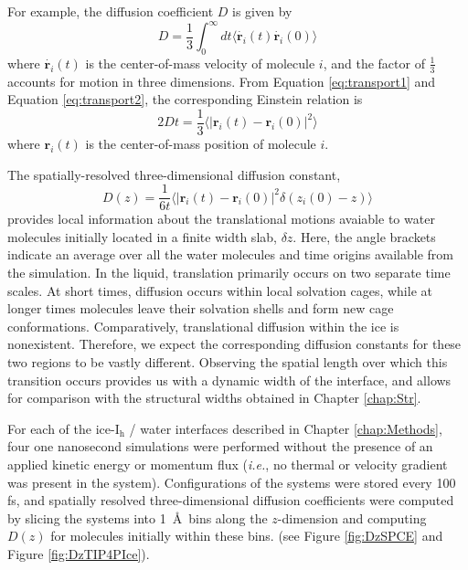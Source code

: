 For example, the diffusion coefficient $D$ is given by
\begin{equation}\label{eq:diffusion1}
D = \frac{1}{3} \int_0^{\infty} dt \langle \dot{\mathbf{r}_i}(t) 
\dot{\mathbf{r}_i}(0) \rangle
\end{equation}
where $\dot{\mathbf{r}_i}(t)$ is the center-of-mass velocity of molecule
$i$, and the factor of $\frac{1}{3}$ accounts for motion in three
dimensions. From Equation \eqref{eq:transport1} and Equation \eqref{eq:transport2},
the corresponding Einstein relation is
\begin{equation}\label{eq:diffusion2}
2Dt = \frac{1}{3} \langle | \mathbf{r}_i(t) - \mathbf{r}_i(0) |^2 \rangle
\end{equation}
where $\mathbf{r}_i(t)$ is the center-of-mass position of molecule
$i$. 

The spatially-resolved three-dimensional diffusion constant,
\begin{equation}\label{eq:diffusion3}
D(z) = \frac{1}{6t} \langle | \mathbf{r}_i(t) - \mathbf{r}_i(0) |^2
\delta(z_i(0) - z)  \rangle 
\end{equation}
provides local information about the translational motions avaiable to
water molecules initially located in a finite width slab, $\delta
z$. Here, the angle brackets indicate an average over all the water
molecules and time origins available from the simulation. In the
liquid, translation primarily occurs on two separate time scales. At
short times, diffusion occurs within local solvation cages, while at
longer times molecules leave their solvation shells and form new cage
conformations. Comparatively, translational diffusion within the ice
is nonexistent. Therefore, we expect the corresponding diffusion
constants for these two regions to be vastly different. Observing the
spatial length over which this transition occurs provides us with a
dynamic width of the interface, and allows for comparison with the
structural widths obtained in Chapter \ref{chap:Str}.

For each of the ice-I$_\mathrm{h}$ / water interfaces described in
Chapter \ref{chap:Methods}, four one nanosecond simulations were
performed without the presence of an applied kinetic energy or
momentum flux (\textit{i.e.}, no thermal or velocity gradient was
present in the system). Configurations of the systems were stored
every 100 fs, and spatially resolved three-dimensional diffusion
coefficients were computed by slicing the systems into 1~\AA~bins
along the $z$-dimension and computing $D(z)$ for molecules initially
within these bins. (see Figure \ref{fig:DzSPCE} and Figure
\ref{fig:DzTIP4PIce}).

